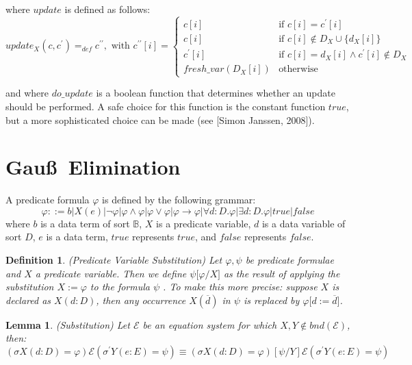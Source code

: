 \documentclass{article}
\newtheorem{definition}[theorem]{Definition}
\newtheorem{lemma}[theorem]{Lemma}
\begin{document}
where $update$ is defined as follows:%
\begin{equation*}
update_{X}(c,c^{\prime })=_{def}c^{\prime \prime },\text{ with }c^{\prime
\prime }[i]=\left\{ 
\begin{array}{ll}
c[i] & \text{if }c[i]=c^{\prime }[i] \\ 
c[i] & \text{if }c[i]\notin D_{X}\cup \{d_{X}[i]\} \\ 
c^{\prime }[i] & \text{if }c[i]=d_{X}[i]\wedge c^{\prime }[i]\notin D_{X} \\ 
fresh\_var(D_{X}[i]) & \text{otherwise}%
\end{array}%
\right.
\end{equation*}

and where $do\_update$ is a boolean function that determines whether an
update should be performed. A safe choice for this function is the constant
function $true$, but a more sophisticated choice can be made (see [Simon
Janssen, 2008]).\pagebreak

\section{Gau\ss\ Elimination}

A predicate formula $\varphi $ is defined by the following grammar:%
\begin{equation*}
\varphi ::=b|X(e)|\lnot \varphi |\varphi \wedge \varphi |\varphi \vee
\varphi |\varphi \rightarrow \varphi |\forall d:D.\varphi |\exists
d:D.\varphi |true |false
\end{equation*}%
where $b$ is a data term of sort $\mathbb{B}$, $X$ is a predicate variable, $%
d$ is a data variable of sort $D$, $e$ is a data term, $true $ represents $%
true$, and $false $ represents $false$.

\begin{definition}
(Predicate Variable Substitution) Let $\varphi ,\psi $ be predicate formulae
and $X$ a predicate variable. Then we define $\psi \lbrack \varphi /X]$ as
the result of applying the substitution $X:=\varphi $ to the formula $\psi $%
. To make this more precise: suppose $X$ is declared as $X(d:D)$, then any
occurrence $X(\overline{d})$ in $\psi $ is replaced by $\varphi \lbrack d:=%
\overline{d}]$.
\end{definition}

\begin{lemma}
(Substitution) Let $\mathcal{E}$ be an equation system for which $X,Y\notin
bnd(\mathcal{E})$, then:%
\begin{equation*}
(\sigma X(d:D)=\varphi )\mathcal{E}(\sigma ^{\prime }Y(e:E)=\psi )\equiv
(\sigma X(d:D)=\varphi )[\psi /Y]\mathcal{E}(\sigma ^{\prime }Y(e:E)=\psi )
\end{equation*}
\end{lemma}
\end{document}
